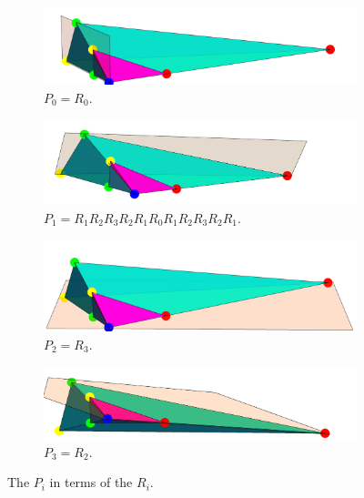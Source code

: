 \documentclass{article}
\theoremstyle{definition}
\begin{document}
	\begin{figure}[H]
	\begin{center}
		\begin{subfigure}{\linewidth}
				\centering
				\includegraphics[width=0.95\linewidth]{fig8a}
				\caption{$P_0=R_0$.}\label{fig:8a}
		\end{subfigure}
		
		\begin{subfigure}{\linewidth}
			\centering
			\includegraphics[width=0.95\linewidth]{fig8b}
			\caption{$P_1=R_1R_2R_3R_2R_1R_0R_1R_2R_3R_2R_1$.}\label{fig:8b}
		\end{subfigure}
		
		\begin{subfigure}{\linewidth}
				\centering
				\includegraphics[width=0.95\linewidth]{fig8c}
				\caption{$P_2=R_3$.}\label{fig:8c}
		\end{subfigure}
		
		\begin{subfigure}{\linewidth}
			\centering
			\includegraphics[width=0.95\linewidth]{fig8d}
			\caption{$P_3=R_2$.}\label{fig:8d}
		\end{subfigure}
		\end{center}
		\caption{The $P_i$ in terms of the $R_i$.}\label{fig:8}
	\end{figure}
	
\end{document}
